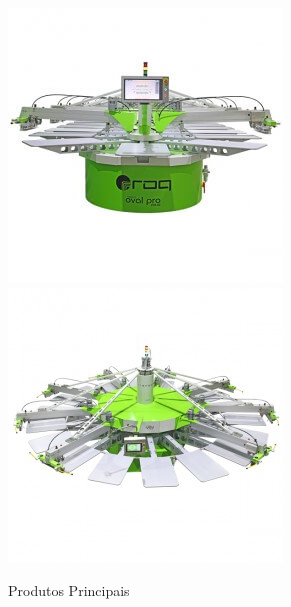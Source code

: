 \begin{figure}[ht]
\begin{center}
		\includegraphics[scale=0.5]{./image/CORGA/ROQ/maquinas/PRO-600x600-275x275.jpg}
		\includegraphics[scale=0.5]{./image/CORGA/ROQ/maquinas/You-600x600-275x275}
	\end{center}
	\caption{Produtos Principais}
\end{figure}
